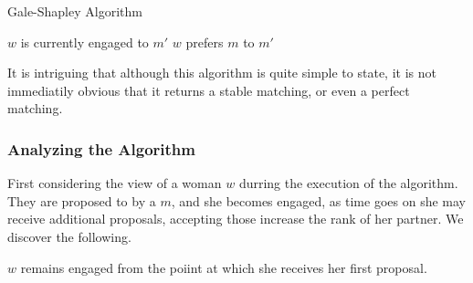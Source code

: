 \documentclass{article}
\newtheorem{theorem}
\begin{document}
\begin{algorithm}[H]
  \caption{Gale-Shapley Algorithm}
  \begin{algorithmic}
      \Else $w$ is currently engaged to $m'$
        \Else $w$ prefers $m$ to $m'$
        \EndIf
      \EndIf
    \EndWhile
  \end{algorithmic}
\end{algorithm}

It is intriguing that although this algorithm is quite simple to state, it is
not immediatily obvious that it returns a stable matching, or even a perfect
matching.

\subsubsection{Analyzing the Algorithm}\label{ssub:analyzing_the_algorithm}

First considering the view of a woman $w$ durring the execution of the
algorithm. They are proposed to by a $m$, and she becomes engaged, as time goes
on she may receive additional proposals, accepting those increase the rank of
her partner. We discover the following.

\begin{theorem}
  $w$ remains engaged from the poiint at which she receives her first proposal.
\end{theorem}
\end{document}
